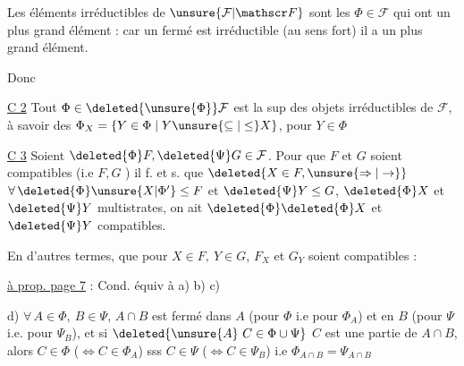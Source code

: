 Les éléments irréductibles de $\unsure{\mathcal F|\mathscr F}$ sont les $\Phi\in\mathcal F$ qui ont  un plus grand élément : car un  fermé est irréductible (au sens fort)  il a un plus grand élément.


Donc

\uline{C 2} Tout $\Phi\in\deleted{\unsure{\Phi}}\mathcal F$ est la sup des objets irréductibles de $\mathcal F$, à savoir des $\Phi_{X}=\{Y\in\Phi\mid Y\unsure{\subseteq|\leq}X\}$, pour $Y\in\Phi$

\uline{C 3} Soient $\deleted{\Phi}F,\deleted{\Psi}G\in\mathcal F$. Pour que $F$ et $G$ soient compatibles (i.e $F,G$ ) il f. et s. que $\deleted{X\in F,\unsure{\Rightarrow|\to}}$ $\forall\,\deleted{\Phi}\unsure{X|{\Phi}'}\leq F$ et $\deleted{\Psi}Y\leq G$, $\deleted{\Phi}X$ et $\deleted{\Psi}Y$  multistrates, on ait $\deleted{\Phi}\deleted{\Phi}X$ et $\deleted{\Psi}Y$ compatibles.

En d'autres termes, que pour $X\in F,\ Y\in G$, $F_X$ et $G_Y$ soient compatibles :

\uline{ à prop. page 7} : Cond. équiv à a) b) c)

d)  $\forall\,A\in\Phi,\ B\in\Psi$, $A\cap B$ est fermé dans $A$ (pour $\Phi$ i.e pour $\Phi_A$) et en $B$ (pour $\Psi$ i.e. pour $\Psi_B$), et si $\deleted{\unsure{A}\ C\in\Phi\cup\Psi}$ $C$ est une partie de $A\cap B$, alors $C\in\Phi$ ($\Leftrightarrow C\in\Phi_A$) sss $C\in\Psi$ ($\Leftrightarrow C\in\Psi_B$) i.e $\Phi_{A\cap B}=\Psi_{A\cap B}$
